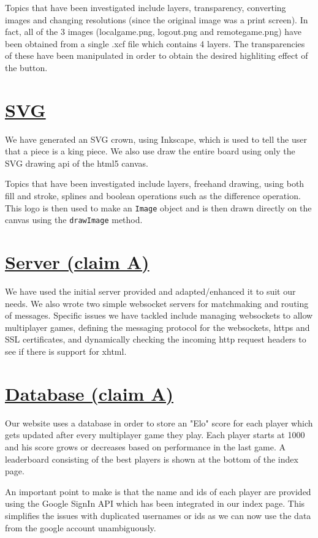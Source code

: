 \documentclass{article}
\begin{document}
    \indent Topics that have been investigated include layers, transparency, converting images and changing resolutions (since the original image was a print screen).
    In fact, all of the 3 images (localgame.png, logout.png and remotegame.png) have been obtained from a single .xcf file which contains 4 layers. The transparencies of these
    have been manipulated in order to obtain the desired highliting effect of the button.
\section{\underline{SVG}}\label{sec:SVG}
    We have generated an SVG crown, using Inkscape, which is used to tell the user that a piece is a king piece. We also use draw the entire board using only the SVG drawing api of the
    html5 canvas.

    \indent Topics that have been investigated include layers, freehand drawing, using both fill and stroke, splines and boolean operations such as the difference operation. This logo is
    then used to make an \verb|Image| object and is then drawn directly on the canvas using the \verb|drawImage| method.
\section{\underline{Server (claim A)}}\label{sec:Server}
    We have used the initial server provided and adapted/enhanced it to suit our needs. We also wrote two simple websocket servers for matchmaking and routing of messages.
    Specific issues we have tackled include managing websockets to allow multiplayer games, defining the messaging protocol for the websockets, https and SSL certificates,
    and dynamically checking the incoming http request headers to see if there is support for xhtml.
\section{\underline{Database (claim A)}}\label{sec:Database}
    Our website uses a database in order to store an "Elo" score for each player which gets updated after every multiplayer
    game they play. Each player starts at 1000 and his score grows or decreases based on performance in the last game. A leaderboard
    consisting of the best players is shown at the bottom of the index page.

    \indent An important point to make is that the name and ids of each player are provided using the Google SignIn API which has been integrated in our
    index page. This simplifies the issues with duplicated usernames or ids as we can now use the data from the google account unambiguously.
\end{document}
